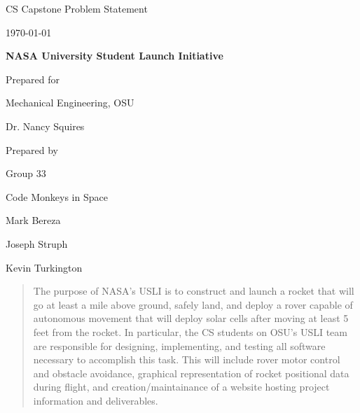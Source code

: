 \documentclass[onecolumn, draftclsnofoot,10pt, compsoc]{IEEEtran}
\def \CapstoneTeamName{		Code Monkeys in Space}
\def \CapstoneTeamNumber{		33}
\def \GroupMemberOne{			Mark Bereza}
\def \GroupMemberTwo{			Joseph Struph}
\def \GroupMemberThree{			Kevin Turkington}
\def \CapstoneProjectName{		NASA University Student Launch Initiative}
\def \CapstoneSponsorCompany{	Mechanical Engineering, OSU}
\def \CapstoneSponsorPerson{		Dr. Nancy Squires}
\def \DocType{		Problem Statement
				}
\newcommand{\NameSigPair}[1]{\par
\makebox[2.75in][r]{#1} \hfil 	\makebox[3.25in]{\makebox[2.25in]{\hrulefill} \hfill		\makebox[.75in]{\hrulefill}}
\par\vspace{-12pt} \textit{\tiny\noindent
\makebox[2.75in]{} \hfil		\makebox[3.25in]{\makebox[2.25in][r]{Signature} \hfill	\makebox[.75in][r]{Date}}}}
\renewcommand{\NameSigPair}[1]{#1}
\begin{document}
\begin{titlepage}
    \begin{singlespace}
        \hfill 
        \par\vspace{.2in}
        \centering
        \scshape{
            \huge CS Capstone \DocType \par
            {\large\today}\par
            \vspace{.5in}
            \textbf{\Huge\CapstoneProjectName}\par
            \vfill
            {\large Prepared for}\par
            \Huge \CapstoneSponsorCompany\par
            \vspace{5pt}
            {\Large\NameSigPair{\CapstoneSponsorPerson}\par}
            {\large Prepared by }\par
            Group\CapstoneTeamNumber\par
            \CapstoneTeamName\par 
            \vspace{5pt}
            {\Large
                \NameSigPair{\GroupMemberOne}\par
                \NameSigPair{\GroupMemberTwo}\par
                \NameSigPair{\GroupMemberThree}\par
            }
            \vspace{20pt}
        }
        \begin{abstract}
        	The purpose of NASA's USLI is to construct and launch a rocket that will go at least a mile above ground, safely land, and deploy a rover capable of autonomous movement that will deploy solar cells after moving at least 5 feet from the rocket. 
			In particular, the CS students on OSU's USLI team are responsible for designing, implementing, and testing all software necessary to accomplish this task. 
			This will include rover motor control and obstacle avoidance, graphical representation of rocket positional data during flight, and creation/maintainance of a website hosting project information and deliverables.
        \end{abstract}     
    \end{singlespace}
\end{titlepage}
\newpage
{}
\tableofcontents
\clearpage
\end{document}
